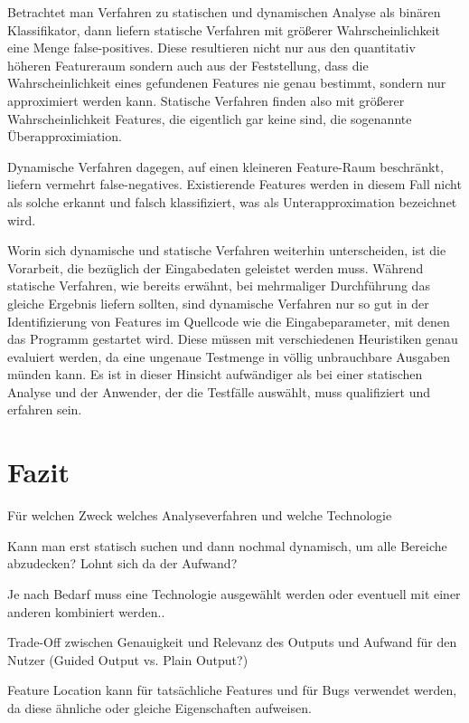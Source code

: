 \documentclass[runningheads,a4paper]{llncs}
\begin{document}
Betrachtet man Verfahren zu statischen und dynamischen Analyse als binären Klassifikator, dann liefern statische Verfahren mit größerer 
Wahrscheinlichkeit eine Menge false-positives. Diese resultieren nicht nur aus den quantitativ höheren Featureraum sondern auch aus
der Feststellung, dass die Wahrscheinlichkeit eines gefundenen Features nie genau bestimmt, sondern nur approximiert werden kann. Statische
Verfahren finden also mit größerer Wahrscheinlichkeit Features, die eigentlich gar keine sind, die sogenannte Überapproximiation.

Dynamische Verfahren dagegen, auf einen kleineren Feature-Raum beschränkt, liefern vermehrt false-negatives. Existierende Features
werden in diesem Fall nicht als solche erkannt und falsch klassifiziert, was als Unterapproximation bezeichnet wird.

Worin sich dynamische und statische Verfahren weiterhin unterscheiden, ist die Vorarbeit, die bezüglich der Eingabedaten geleistet werden muss. Während statische Verfahren, wie bereits erwähnt, bei mehrmaliger Durchführung das gleiche Ergebnis liefern sollten, sind dynamische Verfahren nur so gut in der Identifizierung von Features im Quellcode wie die Eingabeparameter, mit denen das Programm gestartet wird. Diese müssen mit verschiedenen Heuristiken genau evaluiert werden, da eine ungenaue Testmenge in völlig unbrauchbare Ausgaben münden kann. Es ist in dieser Hinsicht aufwändiger als bei einer statischen Analyse und der Anwender, der die Testfälle auswählt, muss qualifiziert und erfahren sein.

\section{Fazit}

Für welchen Zweck welches Analyseverfahren und welche Technologie

Kann man erst statisch suchen und dann nochmal dynamisch, um alle Bereiche abzudecken? Lohnt sich da der Aufwand?

Je nach Bedarf muss eine Technologie ausgewählt werden oder eventuell mit einer anderen kombiniert werden..

Trade-Off zwischen Genauigkeit und Relevanz des Outputs und Aufwand für den Nutzer (Guided Output vs. Plain Output?)

Feature Location kann für tatsächliche Features und für Bugs verwendet werden, da diese ähnliche oder gleiche Eigenschaften aufweisen.




\clearpage

{}


\end{document}
